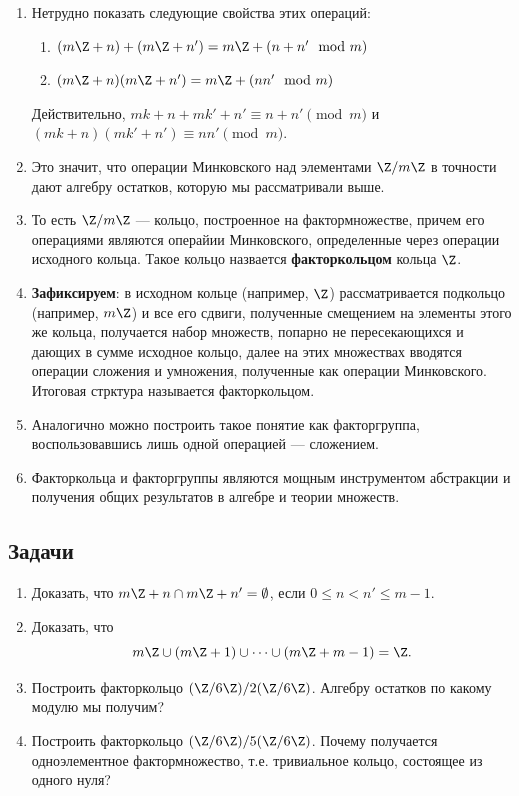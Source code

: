 {\begin{enumerate}
$$
(m\Z+n)+(m\Z+n'),\quad (m\Z+n)(m\Z+n').
$$
\item Нетрудно показать следующие свойства этих операций:
\begin{enumerate}[Z1]
\item $(m\Z+n)+(m\Z+n') = m\Z+(n+n'\mod m)$
\item $(m\Z+n)(m\Z+n') = m\Z+(nn'\mod m)$
\end{enumerate}
Действительно, $mk+n+mk'+n'\equiv n+n'\pmod m$ и $(mk+n)(mk'+n')\equiv nn'\pmod m$.
\item Это значит, что операции Минковского над элементами $\Z/m\Z$ в точности дают алгебру остатков, которую мы рассматривали выше.
\item То есть $\Z/m\Z$ --- кольцо, построенное на фактормножестве, причем его операциями являются операйии Минковского, определенные через операции исходного кольца. Такое кольцо назвается \textbf{факторкольцом} кольца $\Z$.
\item \textbf{Зафиксируем}: в исходном кольце (например, $\Z$) рассматривается подкольцо (например, $m\Z$) и все его сдвиги, полученные смещением на элементы этого же кольца, получается набор множеств, попарно не пересекающихся и дающих в сумме исходное кольцо, далее на этих множествах вводятся операции сложения и умножения, полученные как операции Минковского. Итоговая стрктура называется факторкольцом.
\item Аналогично можно построить такое понятие как факторгруппа, воспользовавшись лишь одной операцией --- сложением.
\item Факторкольца и факторгруппы являются мощным инструментом абстракции и получения общих результатов в алгебре и теории множеств.
\end{enumerate}


\subsection*{Задачи}
\begin{enumerate}
\item Доказать, что $m\Z+n\cap m\Z+n'=\emptyset$, если $0\le n<n'\le m-1$.
\item Доказать, что
$$
m\Z\cup (m\Z+1)\cup\dots\cup (m\Z+m-1) = \Z.
$$
\item Построить факторкольцо $(\Z/6\Z)/2(\Z/6\Z)$. Алгебру остатков по какому модулю мы получим?
\item Построить факторкольцо $(\Z/6\Z)/5(\Z/6\Z)$. Почему получается одноэлементное фактормножество, т.е. тривиальное кольцо, состоящее из одного нуля?
\end{enumerate}
}

